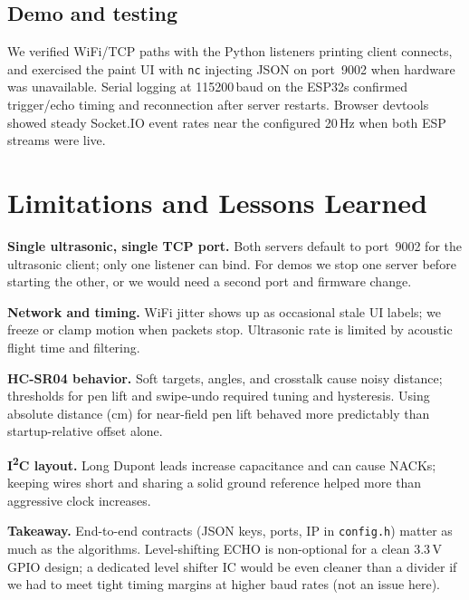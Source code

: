 \documentclass[10pt,twocolumn]{article}
\begin{document}
\subsection{Demo and testing}

We verified WiFi/TCP paths with the Python listeners printing client connects, and exercised the
paint UI with \texttt{nc} injecting JSON on port~9002 when hardware was unavailable. Serial
logging at 115200\,baud on the ESP32s confirmed trigger/echo timing and reconnection after server
restarts. Browser devtools showed steady Socket.IO event rates near the configured 20\,Hz when
both ESP streams were live.

\section{Limitations and Lessons Learned}

\textbf{Single ultrasonic, single TCP port.} Both servers default to port~9002 for the ultrasonic
client; only one listener can bind. For demos we stop one server before starting the other, or we
would need a second port and firmware change.

\textbf{Network and timing.} WiFi jitter shows up as occasional stale UI labels; we freeze or
clamp motion when packets stop. Ultrasonic rate is limited by acoustic flight time and filtering.

\textbf{HC-SR04 behavior.} Soft targets, angles, and crosstalk cause noisy distance; thresholds
for pen lift and swipe-undo required tuning and hysteresis. Using absolute distance (cm) for
near-field pen lift behaved more predictably than startup-relative offset alone.

\textbf{I\textsuperscript{2}C layout.} Long Dupont leads increase capacitance and can cause NACKs;
keeping wires short and sharing a solid ground reference helped more than aggressive clock increases.

\textbf{Takeaway.} End-to-end contracts (JSON keys, ports, IP in \texttt{config.h}) matter as
much as the algorithms. Level-shifting ECHO is non-optional for a clean 3.3\,V GPIO design; a
dedicated level shifter IC would be even cleaner than a divider if we had to meet tight timing
margins at higher baud rates (not an issue here).
\end{document}
